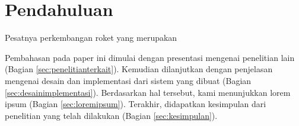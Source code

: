 \section{Pendahuluan}
\label{sec:pendahuluan}


Pesatnya perkembangan roket yang merupakan \lipsum[2-4]

Pembahasan pada paper ini dimulai dengan presentasi mengenai penelitian lain (Bagian \ref{sec:penelitianterkait}).
Kemudian dilanjutkan dengan penjelasan mengenai desain dan implementasi dari sistem yang dibuat (Bagian \ref{sec:desainimplementasi}).
Berdasarkan hal tersebut, kami menunjukkan lorem ipsum (Bagian \ref{sec:loremipsum}).
Terakhir, didapatkan kesimpulan dari penelitian yang telah dilakukan (Bagian \ref{sec:kesimpulan}).
